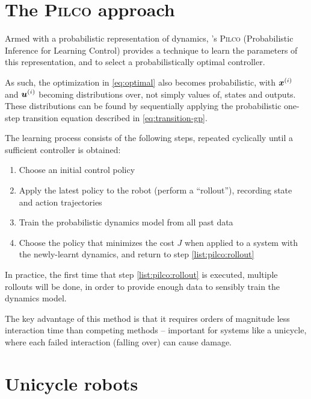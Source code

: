 \documentclass[main.tex]{subfiles}
\begin{document}
\section{The \textsc{Pilco} approach}

	Armed with a probabilistic representation of dynamics, \citeauthor{pilco}'s \textsc{Pilco} \cite{pilco} (Probabilistic Inference for Learning Control) provides a technique to learn the parameters of this representation, and to select a probabilistically optimal controller.

	As such, the optimization in \cref{eq:optimal} also becomes probabilistic\footnotemark, with $\bm{x}^{(i)}$ and $\bm{u}^{(i)}$ becoming distributions over, not simply values of, states and outputs. These distributions can be found by sequentially applying the probabilistic one-step transition equation described in \cref{eq:transition-gp}.


	The learning process consists of the following steps, repeated cyclically until a sufficient controller is obtained:
	\begin{enumerate}[nosep]
		\item Choose an initial control policy
		\item Apply the latest policy to the robot (perform a \enquote{rollout}), recording state and action trajectories \label{list:pilco:rollout}
		\item Train the probabilistic dynamics model from all past data
		\item Choose the policy that minimizes the cost $J$ when applied to a system with the newly-learnt dynamics, and return to step \ref{list:pilco:rollout}
	\end{enumerate}
	In practice, the first time that step \ref{list:pilco:rollout} is executed, multiple rollouts will be done, in order to provide enough data to sensibly train the dynamics model.

	The key advantage of this method is that it requires orders of magnitude less interaction time \cite{pilco} than competing methods -- important for systems like a unicycle, where each failed interaction (falling over) can cause damage.

\section{Unicycle robots}
\end{document}
